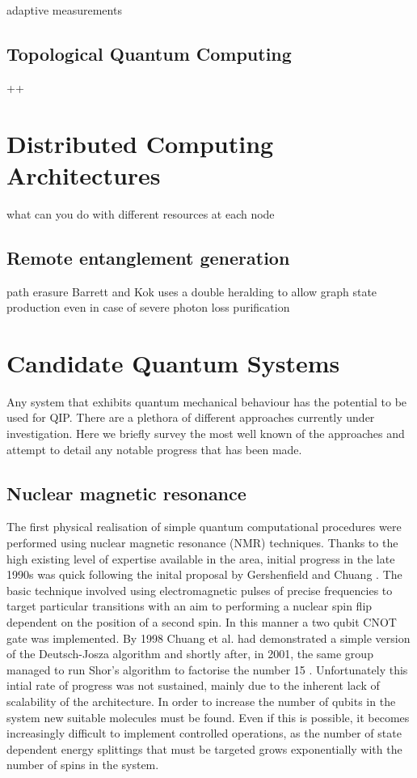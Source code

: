 adaptive measurements


\subsection{Topological Quantum Computing}

++


\section{Distributed Computing Architectures}


what can you do with different resources at each node
\cite{effiecient_distributed_qip_13}

\subsection{Remote entanglement generation}

path erasure \cite{basic_path_erasure} \cite{path_erasure_beam_splitter}
Barrett and Kok \cite{barrett+kok} uses a double heralding to allow graph state production even in case of severe photon loss
purification

\section{Candidate Quantum Systems}

Any system that exhibits quantum mechanical behaviour has the potential to be used for QIP. There are a plethora of different approaches currently under investigation. Here we briefly survey the most well known of the approaches and attempt to detail any notable progress that has been made.

\subsection{Nuclear magnetic resonance}
The first physical realisation of simple quantum computational procedures were performed using nuclear magnetic resonance (NMR) techniques. Thanks to the high existing level of expertise available in the area, initial progress in the late 1990s was quick following the inital proposal by Gershenfield and Chuang \cite{nmr_proposal_chuang_97}. The basic technique involved using electromagnetic pulses of precise frequencies to target particular transitions with an aim to performing a nuclear spin flip dependent on the position of a second spin. In this manner a two qubit CNOT gate was implemented. By 1998 Chuang et al. had demonstrated a simple version of the Deutsch-Josza algorithm \cite{chuang_first_nmr_realisation_98} and shortly after, in 2001, the same group managed to run Shor’s algorithm to factorise the number 15 \cite{nmr_factorise_15_01}. Unfortunately this intial rate of progress was not sustained, mainly due to the inherent lack of scalability of the architecture. In order to increase the number of qubits in the system new suitable molecules must be found. Even if this is possible, it becomes increasingly difficult to implement controlled operations, as the number of state dependent energy splittings that must be targeted grows exponentially with the number of spins in the system.

